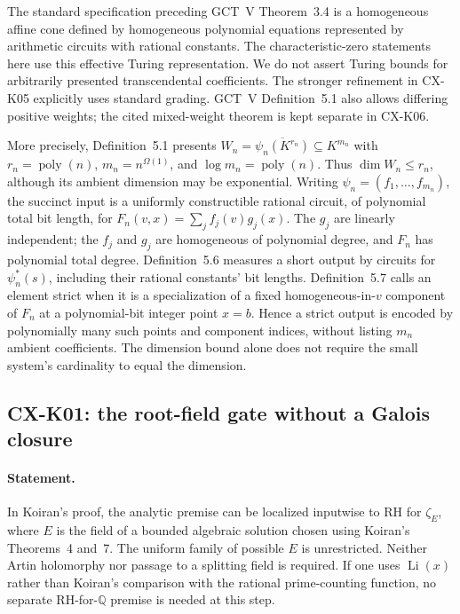 \documentclass[11pt,a4paper]{article}
\begin{document}
The standard specification preceding GCT~V Theorem~3.4 is a homogeneous
affine cone defined by homogeneous polynomial equations represented by
arithmetic circuits with rational constants. The characteristic-zero
statements here use this effective Turing representation. We do not
assert Turing bounds for arbitrarily presented transcendental
coefficients. The stronger refinement in CX-K05 explicitly uses
standard grading. GCT~V Definition~5.1 also allows differing positive
weights; the cited mixed-weight theorem is kept separate in CX-K06.

More precisely, Definition~5.1 presents
$W_n=\overline{\psi_n(K^{r_n})}\subseteq K^{m_n}$ with
$r_n=\operatorname{poly}(n)$, $m_n=n^{\Omega(1)}$, and
$\log m_n=\operatorname{poly}(n)$. Thus
$\dim W_n\le r_n$, although its ambient dimension may be exponential.
Writing $\psi_n=(f_1,\ldots,f_{m_n})$, the succinct input is a
uniformly constructible rational circuit, of polynomial total bit
length, for $F_n(v,x)=\sum_j f_j(v)g_j(x)$. The $g_j$ are linearly
independent; the $f_j$ and $g_j$ are homogeneous of polynomial degree,
and $F_n$ has polynomial total degree. Definition~5.6 measures a short output by circuits for
$\psi_n^*(s)$, including their rational constants' bit lengths.
Definition~5.7 calls an element strict when it is a specialization
of a fixed homogeneous-in-$v$ component of $F_n$ at a polynomial-bit
integer point $x=b$. Hence a strict output is encoded by polynomially
many such points and component indices, without listing $m_n$
ambient coefficients. The dimension bound alone does not require the
small system's cardinality to equal the dimension.

\subsection{CX-K01: the root-field gate without a Galois closure}
\label{cx:k01}

\paragraph{Statement.}
In Koiran's proof, the analytic premise can be localized inputwise to
RH for $\zeta_E$, where $E$ is the field of a bounded algebraic solution
chosen using Koiran's Theorems~4 and~7. The uniform family of possible
$E$ is unrestricted. Neither Artin holomorphy nor passage to a splitting
field is required. If one uses $\operatorname{Li}(x)$ rather than
Koiran's comparison with the rational prime-counting function, no
separate RH-for-$\mathbb Q$ premise is needed at this step.
\end{document}
